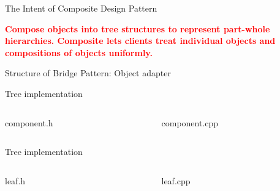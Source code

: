 \documentclass[13pt]{beamer}
\begin{document}
\begin{frame}{The Intent of Composite Design Pattern}
	\begin{center}
	\textcolor{red}{\textbf{Compose objects into tree structures to represent part-whole hierarchies. Composite lets clients treat individual objects and compositions of objects uniformly.}}
	\end{center}
\end{frame}

\begin{frame}{Structure of Bridge Pattern: Object adapter}
	\begin{center}
	\end{center}
\end{frame}

\begin{frame}{Tree implementation}
\begin{columns}[T]
\begin{column}{.45\textwidth}
\lstset{basicstyle=\tiny,style=myCustomCppStyle}
component.h

\end{column}

\begin{column}{.45\textwidth}
\lstset{basicstyle=\tiny,style=myCustomCppStyle}
component.cpp

\end{column}
\end{columns}
\end{frame}

\begin{frame}{Tree implementation}
\begin{columns}[T]
\begin{column}{.45\textwidth}
\lstset{basicstyle=\tiny,style=myCustomCppStyle}
leaf.h

\end{column}

\begin{column}{.45\textwidth}
\lstset{basicstyle=\tiny,style=myCustomCppStyle}
leaf.cpp

\end{column}
\end{columns}
\end{frame}
\end{document}
